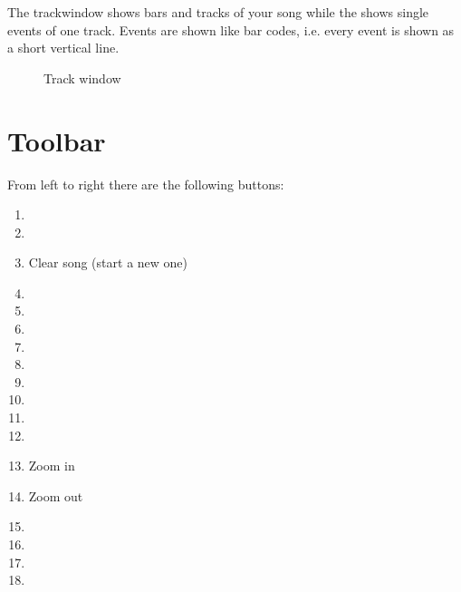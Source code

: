 \documentclass[letterpaper]{report}
\begin{document}
The trackwindow shows bars and tracks of your song while the
 shows single events of one track. Events are shown like
bar codes, i.e. every event is shown as a short vertical line.

\begin{figure}
\caption{Track window}
\end{figure}


\section{Toolbar}\label{twtoolbar}

From left to right there are the following buttons:
\begin{enumerate}
\item {}
\item {}
\item Clear song (start a new one)
\item {}
\item {}
\item {}
\item {}
\item {}
\item {}
\item {}
\item {}
\item {}
\item Zoom in
\item Zoom out
\item {}
\item {}
\item {}
\item {}
\end{enumerate}
\end{document}
